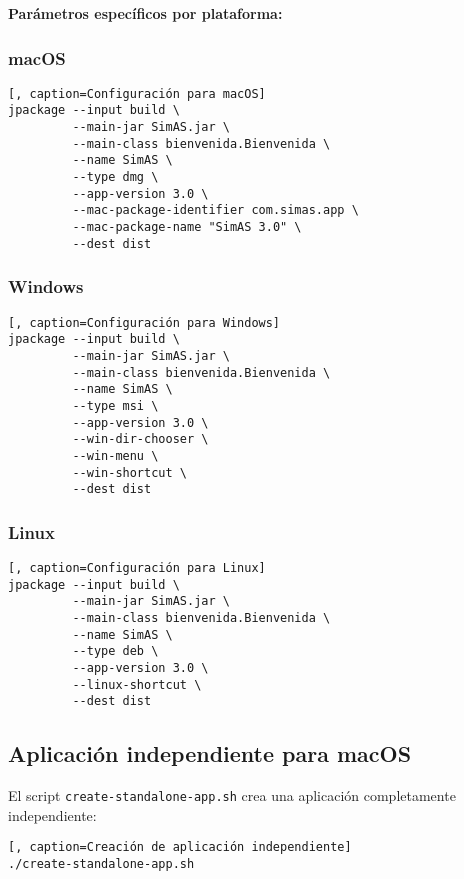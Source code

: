 \textbf{Parámetros específicos por plataforma:}

\subsubsection{macOS}
\begin{lstlisting}[, caption=Configuración para macOS]
jpackage --input build \
         --main-jar SimAS.jar \
         --main-class bienvenida.Bienvenida \
         --name SimAS \
         --type dmg \
         --app-version 3.0 \
         --mac-package-identifier com.simas.app \
         --mac-package-name "SimAS 3.0" \
         --dest dist
\end{lstlisting}

\subsubsection{Windows}
\begin{lstlisting}[, caption=Configuración para Windows]
jpackage --input build \
         --main-jar SimAS.jar \
         --main-class bienvenida.Bienvenida \
         --name SimAS \
         --type msi \
         --app-version 3.0 \
         --win-dir-chooser \
         --win-menu \
         --win-shortcut \
         --dest dist
\end{lstlisting}

\subsubsection{Linux}
\begin{lstlisting}[, caption=Configuración para Linux]
jpackage --input build \
         --main-jar SimAS.jar \
         --main-class bienvenida.Bienvenida \
         --name SimAS \
         --type deb \
         --app-version 3.0 \
         --linux-shortcut \
         --dest dist
\end{lstlisting}

\subsection{Aplicación independiente para macOS}

El script \texttt{create-standalone-app.sh} crea una aplicación completamente independiente:

\begin{lstlisting}[, caption=Creación de aplicación independiente]
./create-standalone-app.sh
\end{lstlisting}

